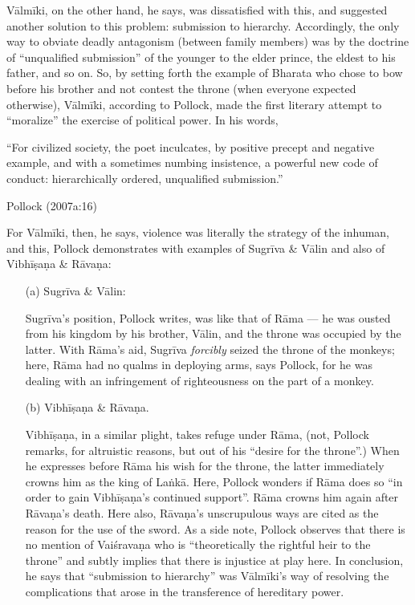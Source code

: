 Vālmīki, on the other hand, he says, was dissatisfied with this, and suggested another solution to this problem: submission to hierarchy. Accordingly, the only way to obviate deadly antagonism (between family members) was by the doctrine of “unqualified submission” of the younger to the elder prince, the eldest to his father, and so on. So, by setting forth the example of Bharata who chose to bow before his brother and not contest the throne (when everyone expected otherwise), Vālmīki, according to Pollock, made the first literary attempt to “moralize” the exercise of political power. In his words,

\begin{myquote}
“For civilized society, the poet inculcates, by positive precept and negative example, and with a sometimes numbing insistence, a powerful new code of conduct: hierarchically ordered, unqualified submission.''

\hfill Pollock (2007a:16)
\end{myquote}

For Vālmīki, then, he says, violence was literally the strategy of the inhuman, and this, Pollock demonstrates with examples of Sugrīva \& Vālin and also of Vibhīṣaṇa \& Rāvaṇa: 
\begin{itemize}
\item[(a)] Sugrīva \& Vālin:

Sugrīva’s position, Pollock writes, was like that of Rāma --- he was ousted from his kingdom by his brother, Vālin, and the throne was occupied by the latter. With Rāma’s aid, Sugrīva {\sl forcibly} seized the throne of the monkeys; here, Rāma had no qualms in deploying arms, says Pollock, for he was dealing with an infringement of righteousness on the part of a monkey. 

\item[(b)] Vibhīṣaṇa \& Rāvaṇa. 

Vibhīṣaṇa, in a similar plight, takes refuge under Rāma, (not, Pollock remarks, for altruistic reasons, but out of his “desire for the throne”.) When he expresses before Rāma his wish for the throne, the latter immediately crowns him as the king of Laṅkā. Here, Pollock wonders if Rāma does so “in order to gain Vibhīṣaṇa’s continued support”. Rāma crowns him again after Rāvaṇa’s death. Here also, Rāvaṇa’s unscrupulous ways are cited as the reason for the use of the sword. As a side note, Pollock observes that there is no mention of Vaiśravaṇa who is “theoretically the rightful heir to the throne” and subtly implies that there is injustice at play here. In conclusion, he says that “submission to hierarchy” was Vālmīki’s way of resolving the complications that arose in the transference of hereditary power. 
\end{itemize}


